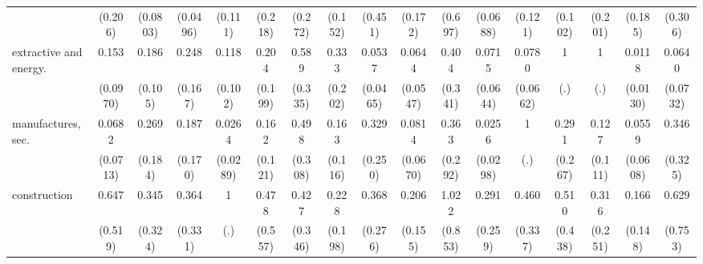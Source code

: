 {\begin{tabular}{l*{16}{c}}
                    &     (0.206)         &    (0.0803)         &    (0.0496)         &     (0.111)         &     (0.218)         &     (0.272)         &     (0.152)         &     (0.451)         &     (0.172)         &     (0.697)         &    (0.0688)         &     (0.121)         &     (0.102)         &     (0.201)         &     (0.185)         &     (0.306)         \\
[1em]
extractive and energy.&       0.153\sym{**} &       0.186\sym{**} &       0.248\sym{*}  &       0.118\sym{*}  &       0.204         &       0.589         &       0.333         &      0.0537\sym{***}&      0.0644\sym{**} &       0.404         &      0.0715\sym{**} &      0.0780\sym{**} &           1         &           1         &      0.0118\sym{***}&      0.0640\sym{*}  \\
                    &    (0.0970)         &     (0.105)         &     (0.167)         &     (0.102)         &     (0.199)         &     (0.335)         &     (0.202)         &    (0.0465)         &    (0.0547)         &     (0.341)         &    (0.0644)         &    (0.0662)         &         (.)         &         (.)         &    (0.0130)         &    (0.0732)         \\
[1em]
manufactures, sec.  &      0.0682\sym{*}  &       0.269         &       0.187         &      0.0264\sym{***}&       0.162\sym{*}  &       0.498         &       0.163\sym{*}  &       0.329         &      0.0814\sym{**} &       0.363         &      0.0256\sym{**} &           1         &       0.291         &       0.127\sym{*}  &      0.0559\sym{**} &       0.346         \\
                    &    (0.0713)         &     (0.184)         &     (0.170)         &    (0.0289)         &     (0.121)         &     (0.308)         &     (0.116)         &     (0.250)         &    (0.0670)         &     (0.292)         &    (0.0298)         &         (.)         &     (0.267)         &     (0.111)         &    (0.0608)         &     (0.325)         \\
[1em]
construction        &       0.647         &       0.345         &       0.364         &           1         &       0.478         &       0.427         &       0.228         &       0.368         &       0.206\sym{*}  &       1.022         &       0.291         &       0.460         &       0.510         &       0.316         &       0.166\sym{*}  &       0.629         \\
                    &     (0.519)         &     (0.324)         &     (0.331)         &         (.)         &     (0.557)         &     (0.346)         &     (0.198)         &     (0.276)         &     (0.155)         &     (0.853)         &     (0.259)         &     (0.337)         &     (0.438)         &     (0.251)         &     (0.148)         &     (0.753)         \\

\end{tabular}}
